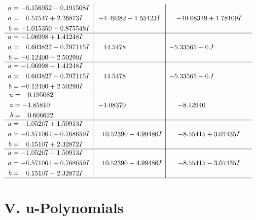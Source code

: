 \documentclass[1p]{elsarticle_modified}
\theoremstyle{definition}
\begin{document}
$$\begin{array}{c|c|c}
\begin{aligned}
u &= -0.156952 - 0.191508 I \\
a &= \phantom{-}0.57547 + 2.26873 I \\
b &= -1.015350 + 0.875548 I\end{aligned}
 & -4.49282 - 1.55423 I & -10.08319 + 1.78109 I \\ \hline\begin{aligned}
u &= -1.06998 + 1.41248 I \\
a &= \phantom{-}0.603827 + 0.797115 I \\
b &= -0.12400 - 2.50290 I\end{aligned}
 & \phantom{-}14.5478\phantom{ +0.000000I} & -5.33565 + 0. I\phantom{ +0.000000I} \\ \hline\begin{aligned}
u &= -1.06998 - 1.41248 I \\
a &= \phantom{-}0.603827 - 0.797115 I \\
b &= -0.12400 + 2.50290 I\end{aligned}
 & \phantom{-}14.5478\phantom{ +0.000000I} & -5.33565 + 0. I\phantom{ +0.000000I} \\ \hline\begin{aligned}
u &= \phantom{-}0.195082\phantom{ +0.000000I} \\
a &= -1.85810\phantom{ +0.000000I} \\
b &= \phantom{-}0.606622\phantom{ +0.000000I}\end{aligned}
 & -1.08370\phantom{ +0.000000I} & -8.12940\phantom{ +0.000000I} \\ \hline\begin{aligned}
u &= -1.05267 + 1.50913 I \\
a &= -0.571061 - 0.768659 I \\
b &= \phantom{-}0.15107 + 2.32872 I\end{aligned}
 & \phantom{-}10.52390 - 4.99486 I & -8.55415 + 3.07435 I \\ \hline\begin{aligned}
u &= -1.05267 - 1.50913 I \\
a &= -0.571061 + 0.768659 I \\
b &= \phantom{-}0.15107 - 2.32872 I\end{aligned}
 & \phantom{-}10.52390 + 4.99486 I & -8.55415 - 3.07435 I\\
 \hline 
 \end{array}$$\newpage
\newpage\renewcommand{\arraystretch}{1}
\centering \section*{ V. u-Polynomials}
\end{document}

